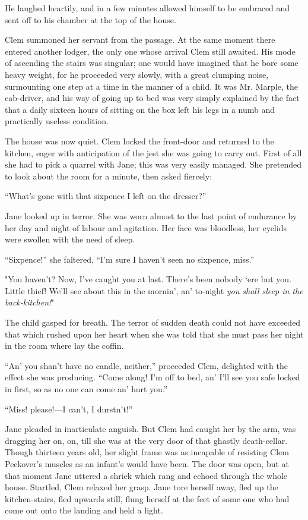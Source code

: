 He laughed heartily, and in a few minutes allowed himself to be embraced
and sent off to his chamber at the top of the house.

{}Clem summoned her servant from the passage. At the same moment there
entered another lodger, the only one whose arrival Clem still awaited.
His mode of ascending the stairs was singular; one would have imagined
that he bore some heavy weight, for he proceeded very slowly, with a
great clumping noise, surmounting one step at a time in the manner of a
child. It was Mr. Marple, the cab-driver, and his way of going up to bed
was very simply explained by the fact that a daily sixteen hours of
sitting on the box left his legs in a numb and practically useless
condition.

The house was now quiet. Clem locked the front-door and returned to the
kitchen, eager with anticipation of the jest she was going to carry out.
First of all she had to pick a quarrel with Jane; this was very easily
managed. She pretended to look about the room for a minute, then asked
fiercely:

``What's gone with that sixpence I left on the dresser?''

Jane looked up in terror. She was worn {}almost to the last point of
endurance by her day and night of labour and agitation. Her face was
bloodless, her eyelids were swollen with the need of sleep.

``Sixpence!'' she faltered, ``I'm sure I haven't seen no sixpence,
miss.''

"You haven't? Now, I've caught you at last. There's been nobody `ere but
you. Little thief! We'll see about this in the mornin', an' to-night
\emph{you shall sleep in the back-kitchen!}"

The child gasped for breath. The terror of sudden death could not have
exceeded that which rushed upon her heart when she was told that she
must pass her night in the room where lay the coffin.

``An' you shan't have no candle, neither,'' proceeded Clem, delighted
with the effect she was producing. ``Come along! I'm off to bed, an'
I'll see you safe locked in first, so as no one can come an' hurt you.''

``Miss! please!---I can't, I durstn't!''

Jane pleaded in inarticulate anguish. But Clem had caught her by the
arm, was {}dragging her on, on, till she was at the very door of that
ghastly death-cellar. Though thirteen years old, her slight frame was as
incapable of resisting Clem Peckover's muscles as an infant's would have
been. The door was open, but at that moment Jane uttered a shriek which
rang and echoed through the whole house. Startled, Clem relaxed her
grasp. Jane tore herself away, fled up the kitchen-stairs, fled upwards
still, flung herself at the feet of some one who had come out onto the
landing and held a light.

